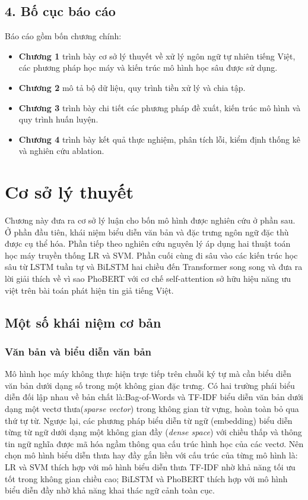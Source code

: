 \documentclass[12pt, a4paper]{report}
\begin{document}
\section*{4. Bố cục báo cáo}

Báo cáo gồm bốn chương chính:
\begin{itemize}[leftmargin=2em]
  \item \textbf{Chương 1} trình bày cơ sở lý thuyết về xử lý ngôn ngữ tự nhiên tiếng Việt, các phương pháp học máy và kiến trúc mô hình học sâu được sử dụng.
  \item \textbf{Chương 2} mô tả bộ dữ liệu, quy trình tiền xử lý và chia tập.
  \item \textbf{Chương 3} trình bày chi tiết các phương pháp đề xuất, kiến trúc mô hình và quy trình huấn luyện.
  \item \textbf{Chương 4} trình bày kết quả thực nghiệm, phân tích lỗi, kiểm định thống kê và nghiên cứu ablation.
\end{itemize}



\chapter{Cơ sở lý thuyết}

Chương này đưa ra cơ sở lý luận cho bốn mô hình được nghiên cứu ở phần sau. Ở phần đầu tiên, khái niệm biểu diễn văn bản và đặc trưng ngôn ngữ đặc thù được cụ thể hóa. Phần tiếp theo nghiên cứu nguyên lý áp dụng hai thuật toán học máy truyền thống LR và SVM. Phần cuối cùng đi sâu vào các kiến trúc học sâu từ LSTM tuần tự và BiLSTM hai chiều đến Transformer song song và đưa ra lời giải thích về vì sao PhoBERT với cơ chế self-attention sở hữu hiệu năng ưu việt trên bài toán phát hiện tin giả tiếng Việt.

\section{Một số khái niệm cơ bản}

\subsection{Văn bản và biểu diễn văn bản}
Mô hình học máy không thực hiện trực tiếp trên chuỗi ký tự mà cần biểu diễn văn bản dưới dạng số trong một không gian đặc trưng. Có hai trường phái biểu diễn đối lập nhau về bản chất là:Bag-of-Words và TF-IDF biểu diễn văn bản dưới dạng một vectơ thưa(\textit{sparse vector}) trong không gian từ vựng, hoàn toàn bỏ qua thứ tự từ. Ngược lại, các phương pháp biểu diễn từ ngữ (embedding) biểu diễn từng từ ngữ dưới dạng một không gian đầy (\textit{dense space}) với chiều thấp và thông tin ngữ nghĩa được mã hóa ngầm thông qua cấu trúc hình học của các vectơ. Nên chọn mô hình biểu diễn thưa hay đầy gắn liền với cấu trúc của từng mô hình là:
LR và SVM thích hợp với mô hình biểu diễn thưa TF-IDF nhờ khả năng tối ưu tốt trong không gian chiều cao;
BiLSTM và PhoBERT thích hợp với mô hình biểu diễn đầy nhờ khả năng khai thác ngữ cảnh toàn cục.
\end{document}
